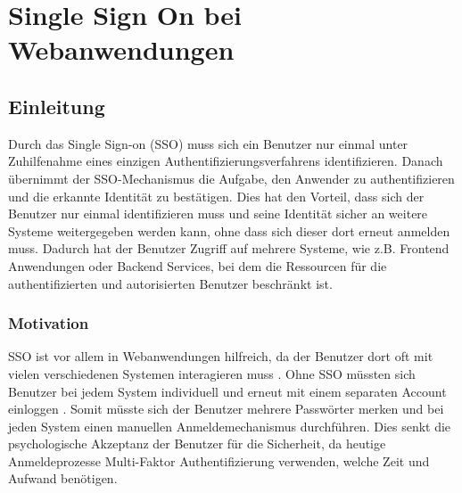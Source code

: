 \chapter{Single Sign On bei Webanwendungen}





\section{Einleitung} \label{EB_Einleitung}

Durch das Single Sign-on (SSO) muss sich ein Benutzer nur einmal unter Zuhilfenahme eines einzigen Authentifizierungsverfahrens identifizieren. Danach übernimmt der SSO-Mechanismus die Aufgabe, den Anwender zu authentifizieren und die erkannte Identität zu bestätigen. Dies hat den Vorteil, dass sich der Benutzer nur einmal identifizieren muss und seine Identität sicher an weitere Systeme weitergegeben werden kann, ohne dass sich dieser dort erneut anmelden muss. Dadurch hat der Benutzer Zugriff auf mehrere Systeme, wie z.B. Frontend Anwendungen oder Backend Services, bei dem die Ressourcen für die authentifizierten und autorisierten Benutzer beschränkt ist.

\subsection{Motivation} %


SSO ist vor allem in Webanwendungen hilfreich, da der Benutzer dort oft mit vielen verschiedenen Systemen interagieren muss \cite{EB34}. Ohne SSO müssten sich Benutzer bei jedem System individuell und erneut mit einem separaten Account einloggen \cite{EB34}. Somit müsste sich der Benutzer mehrere Passwörter merken und bei jeden System einen manuellen Anmeldemechanismus durchführen. Dies senkt die psychologische Akzeptanz der Benutzer für die Sicherheit, da heutige Anmeldeprozesse Multi-Faktor Authentifizierung verwenden, welche Zeit und Aufwand benötigen.

